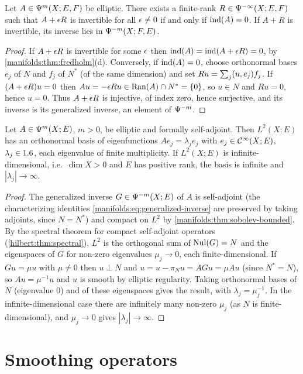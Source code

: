 \begin{proposition}\label{manifolds:prop:perturbation}
Let $A\in\Psi^{m}(X;E,F)$ be elliptic. There exists a finite-rank
$R\in\Psi^{-\infty}(X;E,F)$ such that $A+\epsilon R$ is invertible for all $\epsilon\ne0$ if and only if
$\operatorname{ind}(A)=0$. If $A+R$ is invertible, its inverse lies in $\Psi^{-m}(X;F,E)$.
\end{proposition}
\begin{proof}
If $A+\epsilon R$ is invertible for some $\epsilon$ then $\operatorname{ind}(A)=\operatorname{ind}(A+\epsilon R)=0$, by
\cref{manifolds:thm:fredholm}(d). Conversely, if $\operatorname{ind}(A)=0$, choose orthonormal bases
$e_j$ of $N$ and $f_j$ of $N^*$ (of the same dimension) and set
$Ru=\sum_j( u, e_j)f_j$. If $(A+\epsilon R)u=0$ then $Au=-\epsilon Ru\in\operatorname{Ran}(A)\cap N^*=\{0\}$, so
$u\in N$ and $Ru=0$, hence $u=0$. Thus $A+\epsilon R$ is injective, of index zero, hence
surjective, and its inverse is its generalized inverse, an element of
$\Psi^{-m}$.
\end{proof}

\begin{theorem}\label{manifolds:thm:eigen}
Let $A\in\Psi^{m}(X;E)$, $m>0$, be elliptic and formally self-adjoint. Then
$L^2(X;E)$ has an orthonormal basis of eigenfunctions $Ae_j=\lambda_je_j$ with
$e_j\in\mathcal{C}^\infty(X;E)$, $\lambda_j\in1.6$, each eigenvalue of finite multiplicity. If
$L^2(X;E)$ is infinite-dimensional, i.e.\ $\dim X>0$ and $E$ has positive rank, the
basis is infinite and $|\lambda_j|\to\infty$.
\end{theorem}
\begin{proof}
The generalized inverse $G\in\Psi^{-m}(X;E)$ of $A$ is self-adjoint (the
characterizing identities \eqref{manifolds:eq:generalized-inverse} are preserved by
taking adjoints, since $N=N^*$) and compact on $L^2$ by
\cref{manifolds:thm:sobolev-bounded}. By the spectral theorem for compact
self-adjoint operators (\cref{hilbert:thm:spectral}), $L^2$ is the orthogonal sum of
$\operatorname{Nul}(G)=N$ and the eigenspaces of $G$ for non-zero eigenvalues $\mu_j\to0$, each
finite-dimensional. If $Gu=\mu u$ with $\mu\ne0$ then $u\perp N$ and
$u=u-\pi_{N}u=AGu=\mu Au$ (since $N^*=N$), so $Au=\mu^{-1}u$ and $u$ is smooth by elliptic regularity. Taking
orthonormal bases of $N$ (eigenvalue $0$) and of these eigenspaces gives the result,
with $\lambda_j=\mu_j^{-1}$. In the infinite-dimensional case there are infinitely many
non-zero $\mu_j$ (as $N$ is finite-dimensional), and $\mu_j\to0$ gives $|\lambda_j|\to\infty$.
\end{proof}

\section{Smoothing operators}\label{manifolds:sec:smoothing}

